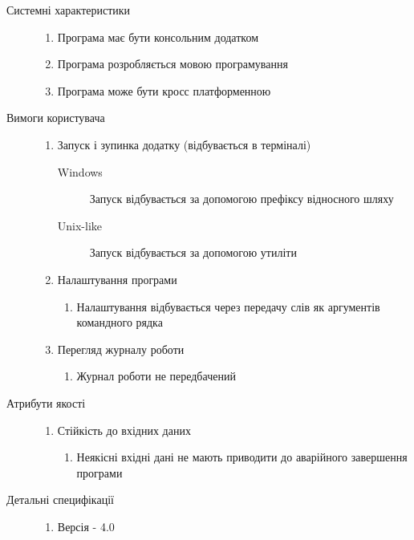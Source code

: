 \begin{description}
	\item[Системні характеристики]\directenv
		\begin{enumerate}
			\item Програма має бути консольним додатком
			\item Програма розробляється мовою програмування  
			\item Програма може бути кросс платформенною
		\end{enumerate}
	\item[Вимоги користувача]\directenv
		\begin{enumerate}
			\item Запуск і зупинка додатку (відбувається в терміналі)
				\begin{description}
					\item[Windows]
						Запуск відбувається за допомогою префіксу відносного шляху 
					\item[Unix-like]
						Запуск відбувається за допомогою утиліти 
				\end{description}
			\item Налаштування програми
				\begin{enumerate}
					\item Налаштування відбувається через передачу слів як аргументів командного рядка
				\end{enumerate}
			\item Перегляд журналу роботи
				\begin{enumerate}
					\item Журнал роботи не передбачений
				\end{enumerate}
		\end{enumerate}
	\item[Атрибути якості]\directenv
		\begin{enumerate}
			\item Стійкість до вхідних даних
				\begin{enumerate}
					\item Неякісні вхідні дані не мають приводити до аварійного завершення програми
				\end{enumerate}
		\end{enumerate}
	\item[Детальні специфікації]\directenv
		\begin{enumerate}
			\item Версія  - 4.0
		\end{enumerate}
\end{description}

